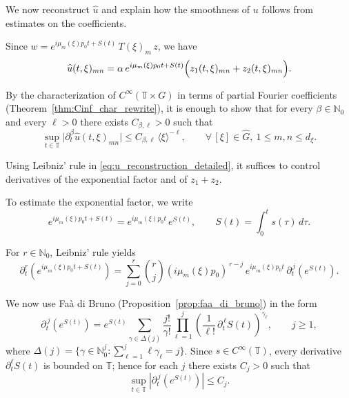 \documentclass[11pt,reqno]{amsart}
\numberwithin{equation}{section}
\begin{document}
	We now reconstruct $\widehat u$ and explain how the smoothness of $u$ follows from estimates on the coefficients. 
	
	Since $w=e^{i\mu_m(\xi)p_0 t+S(t)}\,T(\xi)_m\,z$, we have
	\begin{equation}\label{eq:u_reconstruction_detailed}
		\widehat u(t,\xi)_{mn}
		=
		\alpha\,e^{i\mu_m(\xi)p_0 t+S(t)}\Bigl(z_1(t,\xi)_{mn}+z_2(t,\xi)_{mn}\Bigr).
	\end{equation}
	
	By the characterization of $C^\infty(\mathbb{T}\times G)$ in terms of partial Fourier coefficients (Theorem~\ref{thm:Cinf_char_rewrite}), it is enough to show that for every $\beta\in\mathbb{N}_0$ and every $\ell>0$ there exists $C_{\beta,\ell}>0$ such that
	\begin{equation}\label{eq:goal_decay}
		\sup_{t\in\mathbb{T}}\bigl|\partial_t^\beta \widehat u(t,\xi)_{mn}\bigr|
		\le C_{\beta,\ell}\,\langle\xi\rangle^{-\ell},
		\qquad \forall\,[\xi]\in\widehat G,\ 1\le m,n\le d_\xi.
	\end{equation}
	
	Using Leibniz' rule in \eqref{eq:u_reconstruction_detailed}, it suffices to control derivatives of the exponential factor and of $z_1+z_2$.
	
	
	To estimate the exponential factor, we write
	\[
	e^{i\mu_m(\xi)p_0 t+S(t)}=e^{i\mu_m(\xi)p_0 t}\,e^{S(t)},
	\qquad S(t)=\int_0^t s(\tau)\,d\tau.
	\]
	
	For $r\in\mathbb{N}_0$, Leibniz' rule yields
	\begin{equation}\label{eq:der_exp_split_final}
		\partial_t^r\!\left(e^{i\mu_m(\xi)p_0 t+S(t)}\right)
		=\sum_{j=0}^r \binom{r}{j} (i\mu_m(\xi)p_0)^{\,r-j}\,e^{i\mu_m(\xi)p_0 t}\,
		\partial_t^{\,j}\!\left(e^{S(t)}\right).
	\end{equation}
	
	We now use Fa\`a di Bruno (Proposition~\ref{prop:faa_di_bruno}) in the form
	\begin{equation}\label{eq:fdb_eS_final}
		\partial_t^{\,j}\!\left(e^{S(t)}\right)
		=
		e^{S(t)}\sum_{\gamma\in\Delta(j)} \frac{j!}{\gamma!}
		\prod_{\ell=1}^{j}\left(\frac{1}{\ell!}\,\partial_t^{\,\ell}S(t)\right)^{\gamma_\ell},
		\qquad j\ge1,
	\end{equation}
	where $\Delta(j)=\{\gamma\in\mathbb{N}_0^j:\sum_{\ell=1}^j \ell\gamma_\ell=j\}$.
	Since $s\in C^\infty(\mathbb{T})$, every derivative $\partial_t^\ell S(t)$ is bounded on $\mathbb{T}$; hence for each $j$ there exists $C_j>0$ such that
	\begin{equation}\label{eq:eS_bound_final}
		\sup_{t\in\mathbb{T}}\left|\partial_t^{\,j}\!\left(e^{S(t)}\right)\right|\le C_j.
	\end{equation}
	
\end{document}
